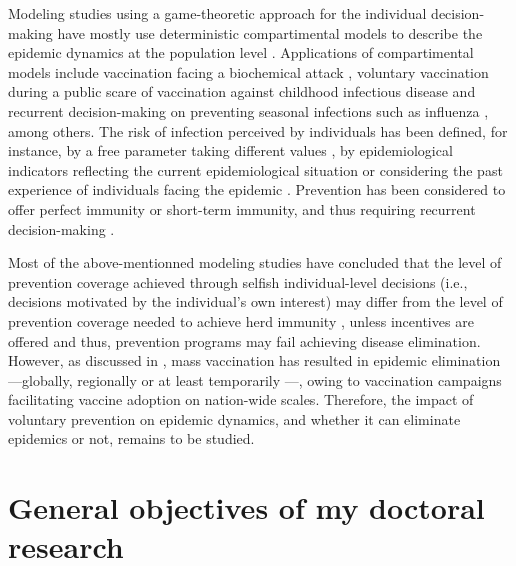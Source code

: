 Modeling studies using a game-theoretic approach for the individual decision-making have mostly use deterministic compartimental models to describe the epidemic dynamics at the population level \cite[]{Bauch2003,Bauch2004,Breban2006,DOnofrio2007,Vardavas2007,Galvani2007,Breban2011,Liu2012}. Applications of compartimental models include vaccination facing a biochemical attack \cite[]{Bauch2003}, voluntary vaccination during a public scare of vaccination against childhood infectious disease \cite[]{Bauch2004} and recurrent decision-making on preventing seasonal infections such as influenza \cite[]{Breban2006,Galvani2007}, among others. The risk of infection perceived by individuals has been defined, for instance, by a free parameter taking different values \cite[]{Bauch2004}, by epidemiological indicators reflecting the current epidemiological situation \cite[]{Bauch2003,DOnofrio2007,Breban2011,Liu2012} or considering the past experience of individuals facing the epidemic \cite[]{Breban2006,Vardavas2007,DOnofrio2007}. Prevention has been considered to offer perfect immunity \cite[]{Bauch2003,Bauch2004,DOnofrio2007} or short-term immunity, and thus requiring recurrent decision-making \cite[]{Breban2006}. 

Most of the above-mentionned modeling studies have concluded that the level of prevention coverage achieved through selfish individual-level decisions  (i.e., decisions motivated by the individual's own interest) may differ from the level of prevention coverage needed to achieve herd immunity \cite[]{Bauch2003,Bauch2004,Breban2006,Galvani2007,Breban2011}, unless incentives are offered \cite[]{Vardavas2007,Liu2012} and thus, prevention programs may fail achieving disease elimination. %
However, as discussed in , mass vaccination has resulted in epidemic elimination ---globally, regionally or at least temporarily ---, owing to vaccination campaigns facilitating vaccine adoption on nation-wide scales. Therefore, the impact of voluntary prevention on epidemic dynamics, and whether it can eliminate epidemics or not, remains to be studied.

\section{General objectives of my doctoral research}
\label{Intro:Objectives} 


